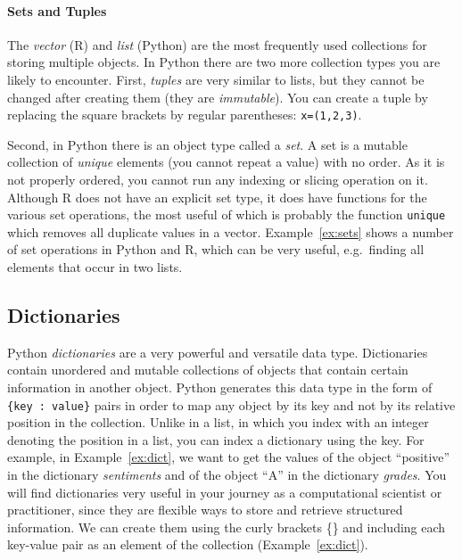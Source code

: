 
\paragraph{Sets and Tuples}
The \emph{vector} (R) and \emph{list} (Python) are the most frequently used collections
for storing multiple objects. 
In Python there are two more collection types you are likely to encounter.
First, \emph{tuples} are very similar to lists, but they cannot be changed after creating them
(they are \emph{immutable}).
You can create a tuple by replacing the square brackets by regular parentheses:
\verb|x=(1,2,3)|. 

Second, in Python there is an object type called a \emph{set}.
A set is a mutable collection of \emph{unique} elements (you cannot repeat a value) with
no order. As it is not properly ordered, you cannot run any indexing
or slicing operation on it.
Although R does not have an explicit set type,
it does have functions for the various set operations,
the most useful of which is probably the function \texttt{unique} which removes all duplicate values in a vector.
Example~\ref{ex:sets} shows a number of set operations in Python and R,
which can be very useful,  e.g.\ finding all elements that occur in two lists.


\subsection{Dictionaries}\label{sec:dictionaries}

Python \emph{dictionaries} are a very powerful and versatile data type.
Dictionaries contain unordered and mutable collections of objects that
contain certain information in another object. Python generates this
data type in the form of \verb|{key : value}| pairs in order
to map any object by its key and not by its relative position in the
collection. Unlike in a list, in which you index with an integer denoting
the position in a list, you can index a dictionary using the key.
For example, in Example~\ref{ex:dict}, we want to get the values of the object ``positive'' in the
dictionary \emph{sentiments} and of the object ``A'' in the dictionary
\emph{grades}. You will
find dictionaries very useful in your journey as a computational
scientist or practitioner, since they are flexible ways to store and
retrieve structured information. We can create them using the curly
brackets \{\} and including each key-value pair as an element of the
collection (Example~\ref{ex:dict}).

